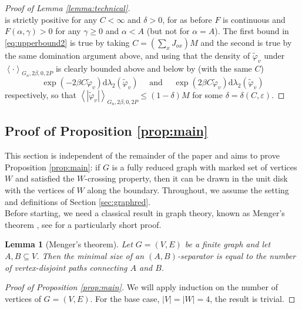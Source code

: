 \documentclass{article}
\newtheorem{lemma}[theorem]{Lemma}
\numberwithin{equation}{section}
\theoremstyle{definition}
\theoremstyle{definition}
\theoremstyle{remark}
\newcommand{\DE}[1]{{\color{red} #1}}
\renewcommand{\d}{\mathrm{d}}
\newcommand\vp{\varphi}
\renewcommand{\d}{\mathrm{d}}
\renewcommand{\l}{\lambda}
\newcommand{\vps}{ \widetilde{\vp}}
\newcommand{\eps}{\varepsilon}
\begin{document}
\begin{proof}[Proof of Lemma \ref{lemma:technical}]
\[	\] 
	is strictly positive for any $C < \infty$ and $\delta > 0$, for as before $F$ is continuous and $F(\alpha,\gamma) > 0$ for any $\gamma \geq 0$ and $\alpha < A$ (but not for $\alpha = A$).
	The first bound in \eqref{eq:upperbound2} is true by taking $C = \left( \sum_{x} J_{ox} \right) M$ and the second is true by the same domination argument above, and using that the density of $\vps_v$ under $\left< \cdot \right>_{G_n,2\beta,0,2P}$ is clearly bounded above and below by (with the same $C$)
	\[
	\exp( -2\beta C \vps_v) \d\l_2(\vps_v) \quad \text{ and }\quad \exp(2\beta C \vps_v) \d\l_2(\vps_v)
	\] 
	respectively, so that $\left< |\vps_v| \right>_{G_n,2\beta,0,2P} \leq (1-\delta)M$ for some $\delta = \delta(C,\eps)$.
\end{proof}
\begin{appendices}
\section{Proof of Proposition \ref{prop:main}} \label{sec:appendix}
This section is independent of the remainder of the paper and aims to prove Proposition \ref{prop:main}: 
if $G$ is a fully reduced graph with marked set of vertices $W$ and satisfied the $W$-crossing property, 
then it can be drawn in the unit disk with the vertices of $W$ along the boundary. 
Throughout, we assume the setting and definitions of Section \ref{sec:graphred}.
\\[1em]
\noindent Before starting, we need a classical result in graph theory, known as Menger's theorem \cite{Menger}, 
see \cite{Goring} for a particularly short proof. 

\begin{lemma}[Menger's theorem] \label{lemma:Mengerstheorem}
    Let $G=(V,E)$ be a finite graph and let $A, B \subseteq V$. 
    Then the minimal size of an  $(A, B)$-separator is equal to the number of vertex-disjoint paths connecting $A$ and $B$. 
\end{lemma}



\begin{proof}[Proof of Proposition \ref{prop:main}]
    We will apply induction on the number of vertices of $G = (V, E)$. 
    For the base case, $|V| = |W| = 4$, the result is trivial. 
    

\end{proof}
\end{appendices}
\end{document}
